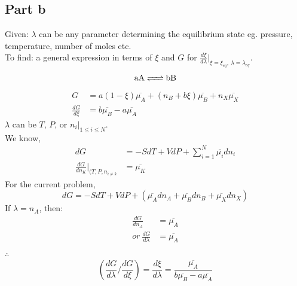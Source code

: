 \documentclass[a4paper,fleqn]{article}
\begin{document}
	\subsection*{Part b}
	Given: $\lambda$ can be any parameter determining the equilibrium state eg. pressure, temperature, number of moles etc.\\
	To find: a general expression in terms of $\xi$ and $G$ for $\frac{d\xi}{d\lambda}|_{\xi = \xi_{eq},~\lambda = \lambda_{eq}}$.\\
	\begin{equation*}
	\ce{aA <=> bB}	
	\end{equation*}
	\begin{equation}
	\begin{split}
	G &= a(1 - \xi)\overline{\mu_A} + (n_B + b\xi)\overline{\mu_B} + n_X \overline{\mu_X}\\
	\frac{dG}{d\xi} &= b\overline{\mu_B} - a\overline{\mu_A}	
	\end{split}
	\end{equation}
	$\lambda$ can be $T$, $P$, or $n_i |_{ 1 \leq i \leq N}$.\\
	We know,
	\begin{equation}
	\begin{split}
	dG &= -SdT + VdP + \sum_{i=1}^{N}\overline{\mu_i}dn_i\\
	\frac{dG}{dn_K}|_{(T, P, n_{i \neq k}} &= \overline{\mu_K} 
	\end{split}
	\end{equation}
	For the current problem,
	\begin{equation}
	dG = -SdT + VdP + \left(\overline{\mu_A}dn_A + \overline{\mu_B}dn_B + \overline{\mu_X}dn_X \right)
	\end{equation}
	If $\lambda = n_A$, then:
	\begin{equation}
	\begin{split}
	\frac{dG}{dn_A} &= \overline{\mu_A}\\
	or~ \frac{dG}{d\lambda} &= \overline{\mu_A}\\
	\end{split}
	\end{equation}
	$\therefore$
	\begin{equation}
	\left( \frac{dG}{d\lambda} \bigg/ \frac{dG}{d\xi} \right) = \frac{d\xi}{d\lambda} = \frac{\overline{\mu_A}}{b\overline{\mu_B} - a\overline{\mu_A}}
	\end{equation}
	
\end{document}
